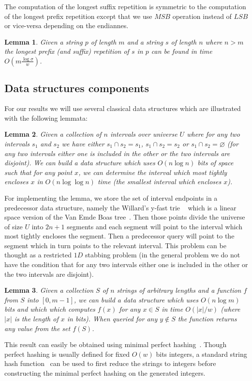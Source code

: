 \documentclass{article}
\newcommand{\?}{\mskip1.5mu}
\newtheorem{lemma}{Lemma}
\renewcommand{\emptyset}{\varnothing}
\begin{document}
The computation of the longest suffix repetition is symmetric to the computation of the longest prefix repetition except that we use $MSB$ operation instead of $LSB$ or vice-versa depending on the endiannes. 
\begin{lemma}
Given a string $p$ of length $m$ and a string $s$ of length $n$ where $n>m$ the longest prefix (and suffix) repetition of $s$ in $p$ can be found in time $O(m\frac{\log\sigma}{w})$.
\end{lemma}
\subsection{Data structures components}
For our results we will use several classical data structures which are illustrated with the following lemmata:
\begin{lemma}\cite{W83}
\label{lemma1}
Given a collection of $n$ intervals over universe $U$ where for any two intervals $s_1$ and $s_2$ we have either $s_1\cap s_2=s_1$, $s_1\cap s_2=s_2$ or $s_1\cap s_2=\emptyset$ (for any two intervals either one is included in the other or the two intervals are disjoint). We can build a data structure which uses $O(n\log n)$ bits of space such that for any point $x$, we can determine the interval which most tightly encloses $x$ in $O(n\log\log n)$ time (the smallest interval which encloses $x$). 
\end{lemma}
For implementing the lemma, we store the set of interval endpoints in a predecessor data structure, namely the Willard's y-fast trie ~\cite{W83} which is a linear space version of the Van Emde Boas tree~\cite{BKZ77}. Then those points divide the universe of size $U$ into $2n+1$ segments and each segment will point to the interval which most tightly encloses the segment. Then a predecessor query will point to the segment which in turn points to the relevant interval. This problem can be thought as a restricted $1D$ stabbing problem (in the general problem we do not have the condition that for any two intervals either one is included in the other or the two intervals are disjoint).

\begin{lemma}
\label{lemma2}
Given a collection $S$ of $n$ strings of arbitrary lengths and a function $f$ from $S$ into $[0,m-1]$, we can build a data structure which uses $O(n\log m)$ bits and which which computes $f(x)$ for any $x\in S$ in time $O(|x|/w)$ (where $|x|$ is the length of $x$ in bits). When queried for any $y\notin S$ the function returns any value from the set $f(S)$. 
\end{lemma}
This result can easily be obtained using minimal perfect hashing~\cite{FKS84,HT01}. Though perfect hashing is usually defined for fixed $O(w)$ bits integers, a standard string hash function~\cite{DGMP} can be used to first reduce the strings to integers before constructing the minimal perfect hashing on the generated integers. 
\end{document}
